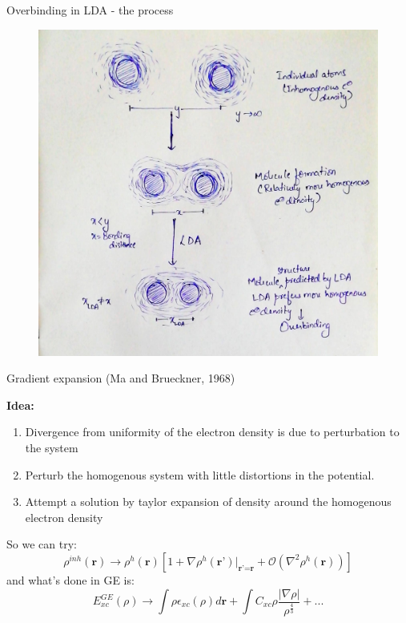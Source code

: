 \documentclass{beamer}
\begin{document}
	\begin{frame}[t]{Overbinding in LDA - the process}
	 \begin{figure}
	  \centering
	  \includegraphics[scale=0.135]{LDA_overbinding.jpg}
	 \end{figure}
	\end{frame}
	
	\begin{frame}[t]{Gradient expansion (Ma and Brueckner, 1968)}
	
	\begin{block}{\textbf{Idea:}}
	\begin{enumerate}
	\item{ Divergence from uniformity of the electron density is due to perturbation to the system}
	\item{Perturb the homogenous system with little distortions in the potential.}
	\item{Attempt a solution by taylor expansion of density around the homogenous electron density}
	\end{enumerate}
	\end{block}
	
	So we can try:
	\begin{equation}\label{eq:14}
		\rho^{inh}(\textbf{r}) \rightarrow \rho^{h}(\textbf{r})\left[1+\nabla \rho^h(\textbf{r'})|_{\textbf{r'=r}} + \mathcal{O}(\nabla^2 \rho^h(\textbf{r})) \right]
	\end{equation}
	and what's done in GE is: 
	\begin{equation}\label{eq:15}
	 E_{xc}^{GE}(\rho) \rightarrow \displaystyle{\int}\rho\epsilon_{xc}(\rho)d\textbf{r} + \displaystyle{\int}C_{xc}\rho\frac{|\nabla\rho|}{\rho^{\frac{4}{3}}} + ...
	\end{equation}
	\end{frame}
	
\end{document}
